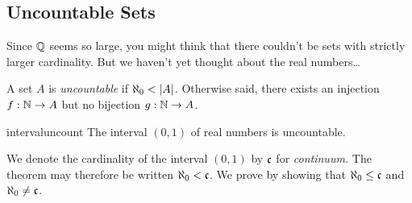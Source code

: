 \clearpage



\subsection{Uncountable Sets}\label{sec:uncountable}

Since $\mathbb{Q}$ seems so large, you might think that there couldn't be sets with strictly larger cardinality. But we haven't yet thought about the real numbers\ldots

\begin{defn}{}{}
	A set $A$ is \emph{uncountable} if $\aleph_0<\left| A\right|$. Otherwise said, there exists an injection $f:\mathbb{N}\to A$ but no bijection $g:\mathbb{N}\to A$.
\end{defn}

\begin{thm}{}{intervaluncount}
	The interval $(0,1)$ of real numbers is uncountable.
\end{thm}

We denote the cardinality of the interval $(0,1)$ by $\mathfrak{c}$ for \emph{continuum.} The theorem may therefore be written $\aleph_0<\mathfrak{c}$. We prove by showing that $\aleph_0\le\mathfrak{c}$ and $\aleph_0\neq\mathfrak{c}$.

